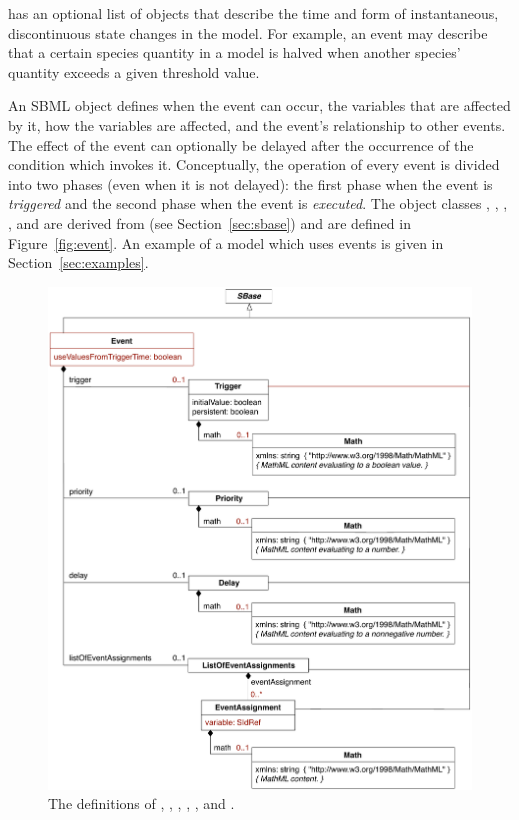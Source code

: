 \Model has an optional list of \Event objects that describe the
time and form of instantaneous, discontinuous state changes in the
model.  For example, an event may describe that a certain species
quantity in a model is halved when another species' quantity
exceeds a given threshold value.

An SBML \Event object defines when the event can occur, the
variables that are affected by it, how the variables are affected,
and the event's relationship to other events.  The effect of the
event can optionally be delayed after the occurrence of the
condition which invokes it.  Conceptually, the operation of every
event is divided into two phases (even when it is not delayed):
the first phase when the event is \emph{triggered} and the second
phase when the event is \emph{executed}.  The object classes
\Event, \Trigger, \Delay, \Priority, \EventAssignment and
\ListOfEventAssignments are derived from \SBase{} (see
Section~\ref{sec:sbase}) and are defined in
Figure~\vref{fig:event}.  An example of a model which uses events
is given in Section~\ref{sec:examples}.

\begin{figure}[htb]
  \centering
  \small
  \vspace*{-1ex}
  \includegraphics[scale=0.77]{figs/event-uml}
  \vspace*{-1ex}
  \caption{The definitions of \Event, \Trigger, \Delay, \Priority,
    \EventAssignment, and \ListOfEventAssignments.}
  \label{fig:event}
\end{figure}


